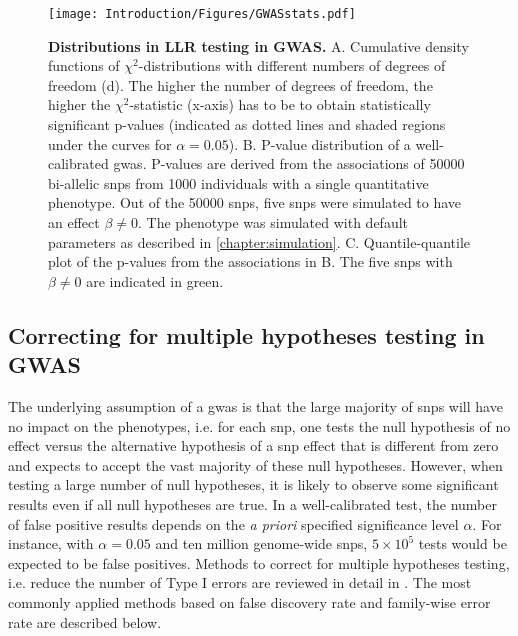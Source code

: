 \begin{figure}[hbtp]
	\centering
	\texttt{[image: Introduction/Figures/GWASstats.pdf]}
	\caption[\textbf{Distributions in LLR testing in GWAS.}]{\textbf{Distributions in LLR testing in GWAS. }A. Cumulative density functions of \(\chi^2\)-distributions with different numbers of degrees of freedom (d). The higher the number of degrees of freedom, the higher the \(\chi^2\)-statistic (x-axis) has to be to obtain statistically significant p-values (indicated as dotted lines and shaded regions under the curves for \(\alpha=0.05\)). B. P-value distribution of a well-calibrated \gls{gwas}. P-values are derived from the associations of \num{50000} bi-allelic \glspl{snp} from \num{1000} individuals with a single quantitative phenotype. Out of the \num{50000} \glspl{snp}, five \glspl{snp} were simulated to have an effect \(\beta \neq 0\). The phenotype was simulated with default parameters as described in \cref{chapter:simulation}.  C. Quantile-quantile plot of the p-values from the associations in B. The five \glspl{snp} with \(\beta \neq 0\) are indicated in green.}
	 	\label{fig:GWAS-stats}
\end{figure}

\subsection{Correcting for multiple hypotheses testing in GWAS}
\label{subsection:multiple-testing}
The underlying assumption of a \gls{gwas} is that the large majority of \glspl{snp} will have no impact on the phenotypes, i.e. for each \gls{snp}, one tests the null hypothesis of no effect versus the alternative hypothesis of a \gls{snp} effect that is different from zero and expects to accept the vast majority of these null hypotheses. However, when testing a large number of null hypotheses, it is likely to observe some significant results even if all null hypotheses are true. In a well-calibrated test, the number of false positive results depends on the \textit{a priori} specified significance level \(\alpha\). For instance, with  \(\alpha=0.05\) and ten million genome-wide \glspl{snp}, \(5 \times 10^5\) tests would be expected to be false positives. Methods to correct for multiple hypotheses testing, i.e. reduce the number of Type I errors are reviewed in detail in \citep{Shaffer1995}. The most commonly applied methods based on false discovery rate and family-wise error rate are described below.

